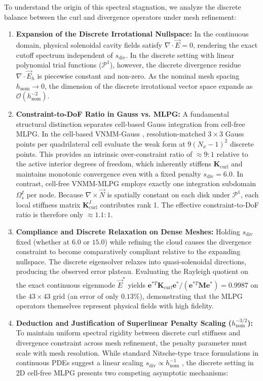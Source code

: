 \documentclass[VANCOUVER,Times1COL]{WileyNJD-v5}
\begin{document}
To understand the origin of this spectral stagnation, we analyze the discrete balance between the curl and divergence operators under mesh refinement:
\begin{enumerate}
    \item \textbf{Expansion of the Discrete Irrotational Nullspace:} In the continuous domain, physical solenoidal cavity fields satisfy $\nabla \cdot \vec{E} = 0$, rendering the exact cutoff spectrum independent of $s_{\mathrm{div}}$. In the discrete setting with linear polynomial trial functions ($\mathcal{P}^1$), however, the discrete divergence residue $\nabla \cdot \vec{E}_h$ is piecewise constant and non-zero. As the nominal mesh spacing $h_{\mathrm{nom}} \to 0$, the dimension of the discrete irrotational vector space expands as $\mathcal{O}(h_{\mathrm{nom}}^{-2})$.
    \item \textbf{Constraint-to-DoF Ratio in Gauss vs. MLPG:} A fundamental structural distinction separates cell-based Gauss integration from cell-free MLPG. In the cell-based VNMM-Gauss \cite{stable_vnmm2d_2026}, resolution-matched $3 \times 3$ Gauss points per quadrilateral cell evaluate the weak form at $9(N_x-1)^2$ discrete points. This provides an intrinsic over-constraint ratio of $\approx 9:1$ relative to the active interior degrees of freedom, which inherently stiffens $\mathbf{K}_{\mathrm{curl}}$ and maintains monotonic convergence even with a fixed penalty $s_{\mathrm{div}} = 6.0$. In contrast, cell-free VNMM-MLPG employs exactly one integration subdomain $\Omega_s^I$ per node. Because $\nabla \times \vec{N}$ is spatially constant on each disk under $\mathcal{P}^1$, each local stiffness matrix $\mathbf{K}_{\mathrm{curl}}^I$ contributes rank 1. The effective constraint-to-DoF ratio is therefore only $\approx 1.1:1$.
    \item \textbf{Compliance and Discrete Relaxation on Dense Meshes:} Holding $s_{\mathrm{div}}$ fixed (whether at $6.0$ or $15.0$) while refining the cloud causes the divergence constraint to become comparatively compliant relative to the expanding nullspace. The discrete eigensolver relaxes into quasi-solenoidal directions, producing the observed error plateau. Evaluating the Rayleigh quotient on the exact continuous eigenmode $\vec{E}^*$ yields $\mathbf{e}^{*T} \mathbf{K}_{\mathrm{curl}} \mathbf{e}^* / (\mathbf{e}^{*T} \mathbf{M} \mathbf{e}^*) = 0.9987$ on the $43 \times 43$ grid (an error of only $0.13\%$), demonstrating that the MLPG operators themselves represent physical fields with high fidelity.
    \item \textbf{Deduction and Justification of Superlinear Penalty Scaling ($h_{\mathrm{nom}}^{-3/2}$):} To maintain uniform spectral rigidity between discrete curl stiffness and divergence constraint across mesh refinement, the penalty parameter must scale with mesh resolution. While standard Nitsche-type trace formulations in continuous PDEs suggest a linear scaling $s_{\mathrm{div}} \propto h_{\mathrm{nom}}^{-1}$ \cite{nitsche1971uber, juntunen2009nitsche}, the discrete setting in 2D cell-free MLPG presents two competing asymptotic mechanisms:

\end{enumerate}
\end{document}
